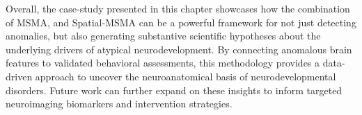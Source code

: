 Overall, the case-study presented in this chapter showcases how the combination of MSMA, and Spatial-MSMA can be a powerful framework for not just detecting anomalies, but also generating substantive scientific hypotheses about the underlying drivers of atypical neurodevelopment. By connecting anomalous brain features to validated behavioral assessments, this methodology provides a data-driven approach to uncover the neuroanatomical basis of neurodevelopmental disorders. Future work can further expand on these insights to inform targeted neuroimaging biomarkers and intervention strategies.